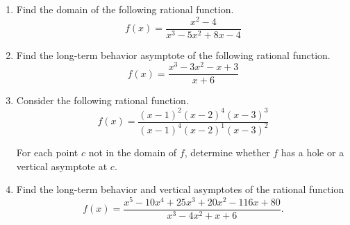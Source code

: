 \documentclass{article}
\begin{document}
\ActivityTitle[class={College Algebra}, number={6}, name={Rational Functions}]

\begin{enumerate}
\item Find the domain of the following rational function. \[ f(x) = \frac{x^2 - 4}{x^3 - 5x^2 + 8x - 4} \] \vspace{3cm}

\item Find the long-term behavior asymptote of the following rational function. \[ f(x) = \frac{x^3 - 3x^2 - x + 3}{x + 6} \] \vspace{7cm}

\item Consider the following rational function. \[ f(x) = \frac{(x-1)^{2}(x-2)^{4}(x-3)^{3}}{(x-1)^{4}(x-2)^{1}(x-3)^{2}} \]

For each point $c$ not in the domain of $f$, determine whether $f$ has a hole or a vertical asymptote at $c$. \vspace{3cm}

\newpage

\item Find the long-term behavior and vertical asymptotes of the rational function \[ f(x) = \frac{x^5 - 10x^4 + 25x^3 + 20x^2 - 116x + 80}{x^3 - 4x^2 + x + 6}. \] \vspace{3cm}
\end{enumerate}
\end{document}
